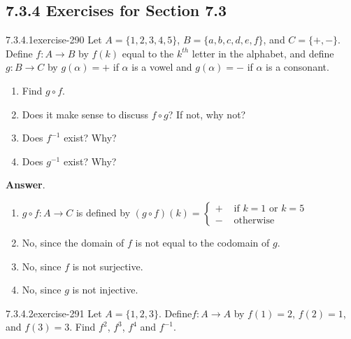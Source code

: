 \documentclass[twoside,10pt,]{book}
\numberwithin{equation}{section}
\begin{document}
\subsection*{7.3.4 Exercises for Section 7.3}
\begin{divisionsolution}{7.3.4.1}{}{exercise-290}%
\hypertarget{p-2454}{}%
Let \(A = \{1,2, 3, 4, 5\}\), \(B = \{a, b, c, d, e,f\}\), and \(C = \{+, -\}\). Define \(f: A \to  B\) by \(f(k)\) equal to the \(k^{th}\) letter in the alphabet, and define \(g : B \rightarrow  C\) by \(g(\alpha ) = +\) if \(\alpha\) is a vowel and \(g(\alpha ) = -\) if \(\alpha\) is a consonant.%
\par
\hypertarget{p-2455}{}%
\leavevmode%
\begin{enumerate}[label=(\alph*)]
\item\hypertarget{li-1243}{}\hypertarget{p-2456}{}%
Find \(g\circ  f\).%
\item\hypertarget{li-1244}{}\hypertarget{p-2457}{}%
Does it make sense to discuss \(f\circ g\)? If not, why not?%
\item\hypertarget{li-1245}{}\hypertarget{p-2458}{}%
Does \(f^{-1}\) exist? Why?%
\item\hypertarget{li-1246}{}\hypertarget{p-2459}{}%
Does \(g^{-1}\) exist? Why?%
\end{enumerate}
%
\par\smallskip%
\noindent\textbf{Answer}.\quad%
\hypertarget{p-2460}{}%
\leavevmode%
\begin{enumerate}[label=(\alph*)]
\item\hypertarget{li-1247}{}\(g\circ f:A\to C\) is defined by \((g\circ f)(k)=\begin{cases}
+ & \textrm{ if } k=1 \textrm{ or } k=5 \\
- & \textrm{ otherwise}
\end{cases}\)%
\item\hypertarget{li-1248}{}\hypertarget{p-2461}{}%
No, since the domain of \(f\) is not equal to the codomain of \(g\).%
\item\hypertarget{li-1249}{}\hypertarget{p-2462}{}%
No, since \(f\) is not surjective.%
\item\hypertarget{li-1250}{}\hypertarget{p-2463}{}%
No, since \(g\) is not injective.%
\end{enumerate}
%
\end{divisionsolution}%
\begin{divisionsolution}{7.3.4.2}{}{exercise-291}%
\hypertarget{p-2464}{}%
Let \(A = \{1, 2, 3\}\). Define\(f:A\rightarrow A\) by \(f(1) = 2\), \(f(2) = 1\), and \(f(3) = 3\). Find \(f^2\), \(f^3\), \(f^4\) and \(f^{-1}\).%
\end{divisionsolution}%
\end{document}
